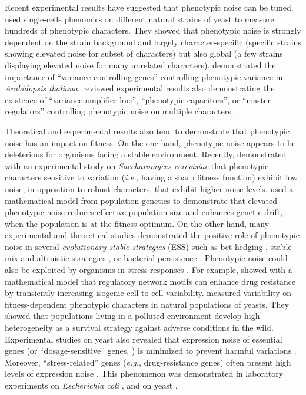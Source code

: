Recent experimental results have suggested that phenotypic noise can be tuned. \cite{yvert-et-al-2013} used single-cells phenomics \citep{ohya-et-al-2015} on different natural strains of yeast to measure hundreds of phenotypic characters. They showed that phenotypic noise is strongly dependent on the strain background and largely character-specific (specific strains showing elevated noise for subset of characters) but also global (a few strains displaying elevated noise for many unrelated characters). 
\cite{shen-et-al-2012} demonstrated the importance of ``variance-controlling genes'' controlling phenotypic variance in \textit{Arabidopsis thaliana}. \cite{boukhibar-and-barkoulas-2016} reviewed experimental results also demonstrating the existence of ``variance-amplifier loci'', ``phenotypic capacitors'', or ``master regulators'' controlling phenotypic noise on multiple characters \citep{levy-and-siegal-2008,lempe-et-al-2013}.

Theoretical and experimental results also tend to demonstrate that phenotypic noise has an impact on fitness. On the one hand, phenotypic noise appears to be deleterious for organisms facing a stable environment. Recently, \cite{keren-et-al-2016} demonstrated with an experimental study on \textit{Saccharomyces cerevisiae} that phenotypic characters sensitive to variation (\textit{i.e.}, having a sharp fitness function) exhibit low noise, in opposition to robust characters, that exhibit higher noise levels. \cite{mineta-et-al-2015} used a mathematical model from population genetics to demonstrate that elevated phenotypic noise reduces effective population size and enhances genetic drift, when the population is at the fitness optimum.
On the other hand, many experimental and theoretical studies demonstrated the positive role of phenotypic noise in several \textit{evolutionary stable strategies} (ESS) such as bet-hedging  \citep{kussell-and-leibler-2005,acar-et-al-2008,beaumont-et-al-2009,tsuru-et-al-2011}, stable mix and altruistic strategies \citep{dejong-et-al-2011}, or bacterial persistence \citep{balaban-et-al-2004}.
Phenotypic noise could also be exploited by organisms in stress responses \citep{chalancon-et-al-2012}. For example, \cite{charlebois-et-al-2014} showed with a mathematical model that regulatory network motifs can enhance drug resistance by transiently increasing isogenic cell-to-cell variability. \cite{holland-et-al-2014} measured variability on fitness-dependent phenotypic characters in natural populations of yeasts. They showed that populations living in a polluted environment develop high heterogeneity as a survival strategy against adverse conditions in the wild. Experimental studies on yeast also revealed that expression noise of essential genes \citep{newman-et-al-2006} (or ``dosage-sensitive'' genes, \citealt{fraser-et-al-2004}) is minimized to prevent harmful variations \citep{lehner-2008,wang-and-zhang-2011}. Moreover, ``stress-related'' genes (\textit{e.g.}, drug-resistance genes) often present high levels of expression noise \citep{fraser-and-kaern-2009,zhuravel-et-al-2010,charlebois-et-al-2011,charlebois-et-al-2014,charlebois-2015}. This phenomenon was demonstrated in laboratory experiments on \textit{Escherichia coli} \citep{ito-et-al-2009}, and on yeast \citep{liu-et-al-2015}.

